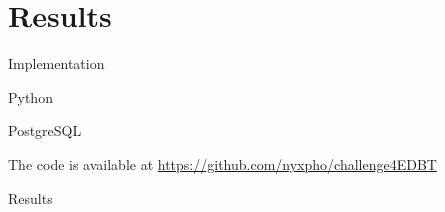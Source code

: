 \documentclass[xcolor=dvipsnames]{beamer}
\begin{document}
\section{Results}
\begin{frame}{Implementation}

Python

\bigskip

PostgreSQL

\bigskip

The code is available at \url{https://github.com/nyxpho/challenge4EDBT}

\end{frame}

\begin{frame}{Results}

\end{frame}
\end{document}
